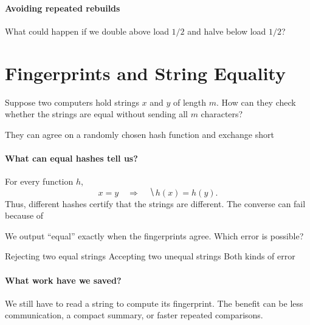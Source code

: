 \documentclass[11pt]{article}
\begin{document}
\paragraph{Avoiding repeated rebuilds}
What could happen if we double above load $1/2$ and halve below load $1/2$?
\vs{.7cm}


\newpage
\section{Fingerprints and String Equality}
Suppose two computers hold strings $x$ and $y$ of length $m$. How can they
check whether the strings are equal without sending all $m$ characters?

They can agree on a randomly chosen hash function and exchange short

\paragraph{What can equal hashes tell us?}
For every function $h$,
\begin{equation*}
    x=y\quad\Longrightarrow\quad\hide{h(x)=h(y)}.
\end{equation*}
Thus, different hashes certify that the strings are different. The converse
can fail because of 

\begin{Qu}
    We output ``equal'' exactly when the fingerprints agree. Which error
    is possible?
    \begin{itemize}
        \aitem Rejecting two equal strings
        \bitem Accepting two unequal strings
        \citem Both kinds of error
    \end{itemize}
\end{Qu}

\paragraph{What work have we saved?}
We still have to read a string to compute its fingerprint. The benefit can
be less communication, a compact summary, or faster repeated comparisons.
\end{document}
